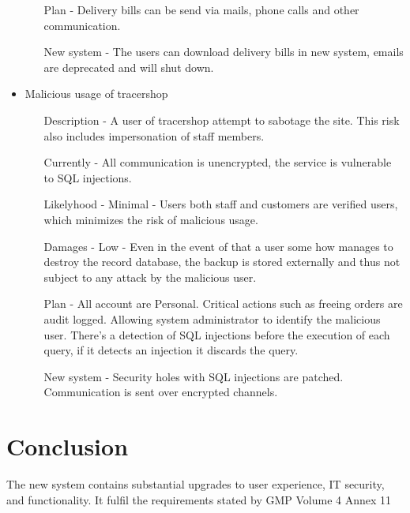 \documentclass{article}
\begin{document}
\begin{itemize}
\begin{itemize}
    \item[Plan] - Delivery bills can be send via mails, phone calls and other communication.
    \item[New system] - The users can download delivery bills in new system, emails are deprecated and will shut down.
  \end{itemize}
  \item Malicious usage of tracershop
  \begin{itemize}
    \item[Description] - A user of tracershop attempt to sabotage the site. This risk also includes impersonation of staff members.
    \item[Currently] - All communication is unencrypted, the service is vulnerable to SQL injections.
    \item[Likelyhood] - Minimal - Users both staff and customers are verified users, which minimizes the risk of malicious usage.
    \item[Damages] - Low - Even in the event of that a user some how manages to destroy the record database, the backup is stored externally and thus not subject to any attack by the malicious user.
    \item[Plan] - All account are Personal. Critical actions such as freeing orders are audit logged. Allowing system administrator to identify the malicious user.
    There's a detection of SQL injections before the execution of each query, if it detects an injection it discards the query.
    \item[New system] - Security holes with SQL injections are patched. Communication is sent over encrypted channels.
  \end{itemize}
\end{itemize}



\section*{Conclusion}

The new system contains substantial upgrades to user experience, IT security,
and functionality. It fulfil the requirements stated by GMP Volume 4 Annex 11


\clearpage

\printglossary[type=main,style=long,nonumberlist]
\end{document}
